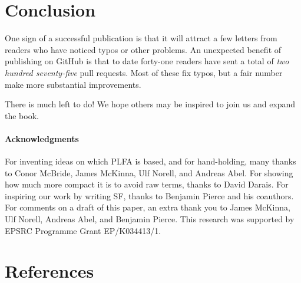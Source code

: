 \documentclass[preprint,authoryear]{elsarticle}
\begin{document}
\section{Conclusion}

One sign of a successful publication is that it will attract a few letters from
readers who have noticed typos or other problems.  An unexpected benefit of
publishing on GitHub is that to date forty-one readers have sent a total of
\emph{two hundred seventy-five} pull requests.  Most of these fix typos, but a
fair number make more substantial improvements.

There is much left to do!  We hope others may be inspired to join us and expand
the book.

\paragraph{Acknowledgments}

For inventing ideas on which PLFA is based, and for hand-holding, many thanks to
Conor McBride, James McKinna, Ulf Norell, and Andreas Abel.  For showing how
much more compact it is to avoid raw terms, thanks to David Darais.  For
inspiring our work by writing SF, thanks to Benjamin Pierce and his coauthors.
For comments on a draft of this paper, an extra thank you to James McKinna, Ulf
Norell, Andreas Abel, and Benjamin Pierce. This research was supported by EPSRC
Programme Grant EP/K034413/1.


\section*{References}



\end{document}

